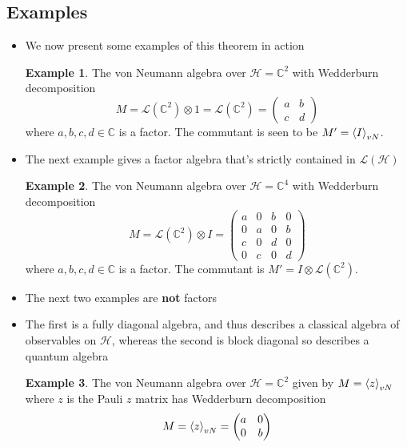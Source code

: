 \documentclass[12pt,a4paper]{article}
\numberwithin{equation}{section}
\newcommand{\gen}[1]{\braket{#1}_{vN}}
\theoremstyle{definition}
\theoremstyle{theorem}
\theoremstyle{example}
\newtheorem{example}{Example}[section]
\begin{document}
	\subsection{Examples}
	\begin{itemize}
		\item We now present some examples of this theorem in action
		\begin{example}
			The von Neumann algebra over $\mathcal{H}=\mathbb{C}^{2}$ with Wedderburn decomposition
			\begin{equation}
				M=\mathcal{L}(\mathbb{C}^{2})\otimes 1=\mathcal{L}(\mathbb{C}^{2})=\begin{pmatrix}
					a&b\\c&d
				\end{pmatrix}
			\end{equation}
			where $a,b,c,d\in\mathbb{C}$ is a factor. The commutant is seen to be $M'=\gen{I}$.
		\end{example}
		\item The next example gives a factor algebra that's strictly contained in $\mathcal{L}(\mathcal{H})$
		\begin{example}
			The von Neumann algebra over $\mathcal{H}=\mathbb{C}^{4}$ with Wedderburn decomposition
			\begin{equation}
				M=\mathcal{L}(\mathbb{C}^{2})\otimes I=\begin{pmatrix}a&0&b&0\\0&a&0&b\\c&0&d&0\\0&c&0&d\end{pmatrix}
			\end{equation}
			where $a,b,c,d\in\mathbb{C}$ is a factor. The commutant is $M'=I\otimes\mathcal{L}(\mathbb{C}^{2})$.
		\end{example}
		\item The next two examples are \textbf{not} factors
		\item The first is a fully diagonal algebra, and thus describes a classical algebra of observables on $\mathcal{H}$, whereas the second is block diagonal so describes a quantum algebra
		\begin{example}
			The von Neumann algebra over $\mathcal{H}=\mathbb{C}^{2}$ given by $M=\gen{z}$ where $z$ is the Pauli $z$ matrix has Wedderburn decomposition
			\begin{equation}
				M=\gen{z}=\begin{pmatrix}
					a&0\\0&b
				\end{pmatrix}

\end{equation}
\end{example}
\end{itemize}
\end{document}
